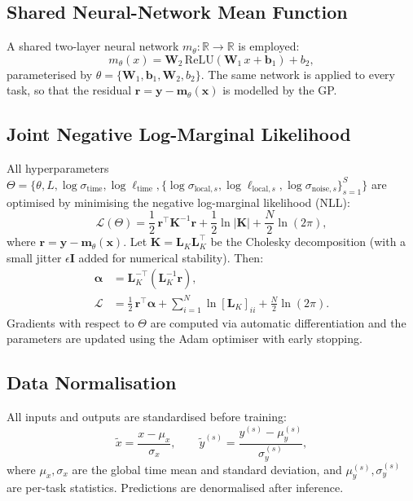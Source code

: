 \documentclass[11pt,a4paper]{article}
\newcommand{\R}{\mathbb{R}}
\begin{document}
\subsection{Shared Neural-Network Mean Function}\label{sec:mean_func}
A shared two-layer neural network $m_\theta: \R \to \R$ is employed:
\begin{equation}
  m_\theta(x) = \bm{W}_2 \,\mathrm{ReLU}(\bm{W}_1\, x + \bm{b}_1) + b_2,
\end{equation}
parameterised by $\theta = \{\bm{W}_1, \bm{b}_1, \bm{W}_2, b_2\}$. The same network is applied to every task, so that the residual $\bm{r} = \bm{y} - \bm{m}_\theta(\bm{x})$ is modelled by the GP.

\subsection{Joint Negative Log-Marginal Likelihood}
All hyperparameters $\Theta = \{\theta, L, \log\sigma_{\text{time}}, \log\ell_{\text{time}}, \{\log\sigma_{\text{local},s},\log\ell_{\text{local},s}, \log\sigma_{\text{noise},s}\}_{s=1}^{S}\}$ are optimised by minimising the negative log-marginal likelihood (NLL):
\begin{equation}\label{eq:nll}
  \mathcal{L}(\Theta) = \frac{1}{2}\,\bm{r}^\top \bm{K}^{-1}\bm{r}
  + \frac{1}{2}\ln|\bm{K}|
  + \frac{N}{2}\ln(2\pi),
\end{equation}
where $\bm{r} = \bm{y} - \bm{m}_\theta(\bm{x})$. Let $\bm{K} = \bm{L}_K \bm{L}_K^\top$ be the Cholesky decomposition (with a small jitter $\epsilon \bm{I}$ added for numerical stability). Then:
\begin{align}
  \bm{\alpha} &= \bm{L}_K^{-\top}(\bm{L}_K^{-1} \bm{r}), \\
  \mathcal{L} &= \frac{1}{2}\,\bm{r}^\top \bm{\alpha}
  + \sum_{i=1}^{N} \ln [\bm{L}_K]_{ii}
  + \frac{N}{2}\ln(2\pi).
\end{align}
Gradients with respect to $\Theta$ are computed via automatic differentiation and the parameters are updated using the Adam optimiser with early stopping.

\subsection{Data Normalisation}
All inputs and outputs are standardised before training:
\begin{equation}
  \tilde{x} = \frac{x - \mu_x}{\sigma_x}, \qquad
  \tilde{y}^{(s)} = \frac{y^{(s)} - \mu_{y}^{(s)}}{\sigma_{y}^{(s)}},
\end{equation}
where $\mu_x, \sigma_x$ are the global time mean and standard deviation, and $\mu_y^{(s)}, \sigma_y^{(s)}$ are per-task statistics. Predictions are denormalised after inference.
\end{document}
